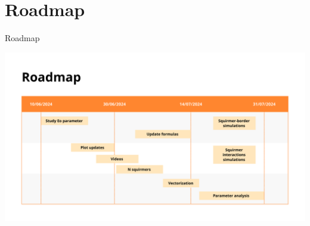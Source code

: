 \documentclass{beamer}
\begin{document}
\section{Roadmap}
\begin{frame}{Roadmap}
    \begin{center}
        \includegraphics[width=1.1\textwidth]{../images/roadmap_stage.png}
    \end{center}
\end{frame}
\end{document}
